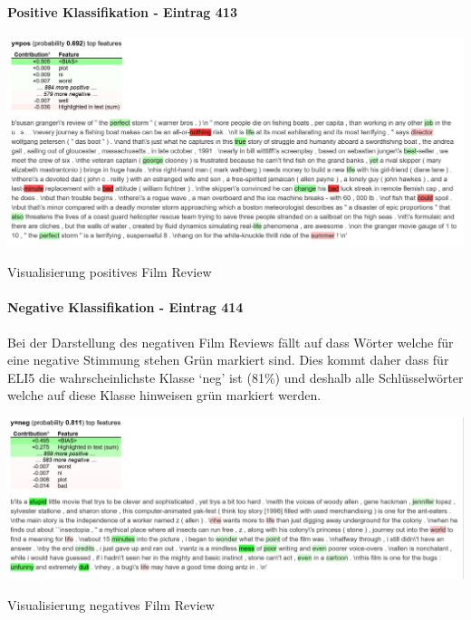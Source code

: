 \documentclass[
  12pt, %
  a4paper, %
  oneside, %
  openany, 
  numbers=noenddot, %
  BCOR=5mm, %
  parskip=half*, %
  thesis, %
]{bfhbook}
\begin{document}
\paragraph*{Positive Klassifikation - Eintrag 413}
\label{eli5413}
\begin{center}
\begin{minipage}[t]{\linewidth}
\includegraphics[width=\textwidth]{Bilder/MovieReviews-SentimentClassification_1.PNG}
\caption{Visualisierung positives Film Review}
\end{minipage}
\end{center}

\paragraph*{Negative Klassifikation - Eintrag 414}
\label{eli5414}
Bei der Darstellung des negativen Film Reviews fällt auf dass Wörter welche für eine negative Stimmung stehen Grün markiert sind. Dies kommt daher dass für ELI5 die wahrscheinlichste Klasse `neg' ist (81\%) und deshalb alle Schlüsselwörter welche auf diese Klasse hinweisen grün markiert werden.

\begin{center}
\begin{minipage}[t]{\linewidth}
\includegraphics[width=\textwidth]{Bilder/MovieReviews-SentimentClassification_2.PNG}
\caption{Visualisierung negatives Film Review}
\end{minipage}
\end{center}
\end{document}
